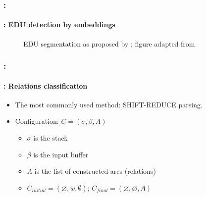 \documentclass[xcolor=table]{beamer}
\begin{document}
\begin{frame}
	\frametitle{\insertshortsubtitle: \insertsection}
	\framesubtitle{\insertsubsection: EDU detection by embeddings}
	
	\begin{figure}
		\centering
		\caption{EDU segmentation as proposed by \cite{2018-wang-al}; figure adapted from \cite{2019-jurafsky-martin}}
	\end{figure}
	
\end{frame}

\begin{frame}
	\frametitle{\insertshortsubtitle: \insertsection}
	\framesubtitle{\insertsubsection: Relations classification}
	
	\begin{minipage}{.65\textwidth}
		\begin{itemize}
			\item The most commonly used method: SHIFT-REDUCE parsing.
			\item Configuration: $C = (\sigma, \beta, A)$
			\begin{itemize}
				\item $\sigma$ is the stack
				\item $\beta$ is the input buffer
				\item $A$ is the list of constructed arcs (relations)
				\item $C_{initial} = (\varnothing, w, \emptyset)$;
				$C_{final} = (\varnothing, \varnothing, A)$
			\end{itemize}
		\end{itemize}
	\end{minipage}
	\begin{minipage}{.33\textwidth}
	\end{minipage}
	

\end{frame}
\end{document}
